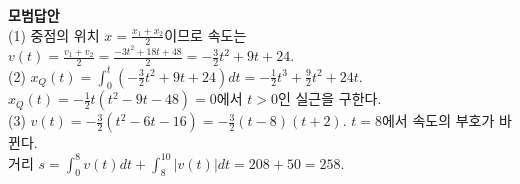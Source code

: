 \documentclass[a4paper,11pt]{article}
\begin{document}
\textbf{모범답안} \\
(1) 중점의 위치 $x = \frac{x_1+x_2}{2}$이므로 속도는 $v(t) = \frac{v_1+v_2}{2} = \frac{-3t^2+18t+48}{2} = -\frac{3}{2}t^2+9t+24$. \\
(2) $x_Q(t) = \int_{0}^{t} (-\frac{3}{2}t^2+9t+24) dt = -\frac{1}{2}t^3 + \frac{9}{2}t^2 + 24t$. \\
$x_Q(t) = -\frac{1}{2}t(t^2-9t-48) = 0$에서 $t>0$인 실근을 구한다. \\
(3) $v(t) = -\frac{3}{2}(t^2-6t-16) = -\frac{3}{2}(t-8)(t+2)$. $t=8$에서 속도의 부호가 바뀐다. \\
거리 $s = \int_{0}^{8} v(t) dt + \int_{8}^{10} |v(t)| dt = 208 + 50 = 258$.
\end{document}

